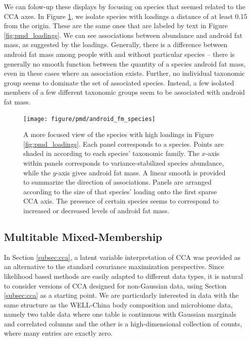 \documentclass{article}
\begin{document}
We can folow-up these displays by focusing on species that seemed related to the
CCA axes. In Figure \ref{fig:pmd_android_fm_species}, we isolate species with
loadings a distance of at least 0.15 from the origin. These are the same ones
that are labeled by text in Figure \ref{fig:pmd_loadings}. We can see
associations between abundance and android fat mass, as suggested by the
loadings. Generally, there is a difference between android fat mass among people
with and without particular species -- there is generally no smooth function
between the quantity of a species android fat mass, even in these cases where an
association exists. Further, no individual taxonomic group seems to dominate the
set of associated species. Instead, a few isolated members of a few different
taxonomic groups seem to be associated with android fat mass.

\begin{figure}
  \centering
  \texttt{[image: figure/pmd/android\_fm\_species]}
  \caption{
    A more focused view of the species with high loadings in Figure
    \ref{fig:pmd_loadings}. Each panel corresponds to a species. Points are
    shaded in according to each species' taxonomic family. The $x$-axis within
    panels corresponds to variance-stabilized species abundance, while the
    $y$-axis gives android fat mass. A linear smooth is provided to summarize
    the direction of associations. Panels are arranged according to the size of
    that species' loading onto the first sparse CCA axis. The presence of
    certain species seems to correspond to increased or decreased levels of
    android fat mass.
    \label{fig:pmd_android_fm_species}
  }
\end{figure}

\subsection{Multitable Mixed-Membership}
\label{subsec:multitable_mixed_membership}

In Section \ref{subsec:cca}, a latent variable interpretation of CCA was
provided as an alternative to the standard covariance maximization perspective.
Since likelihood based methods are easily adapted to different data types, it is
natural to consider versions of CCA designed for non-Gaussian data, using
Section \ref{subsec:cca} as a starting point. We are particularly interested in
data with the same structure as the WELL-China body composition and microbiome
data, namely two table data where one table is continuous with Gaussian
marginals and correlated columns and the other is a high-dimensional collection
of counts, where many entries are exactly zero.
\end{document}
